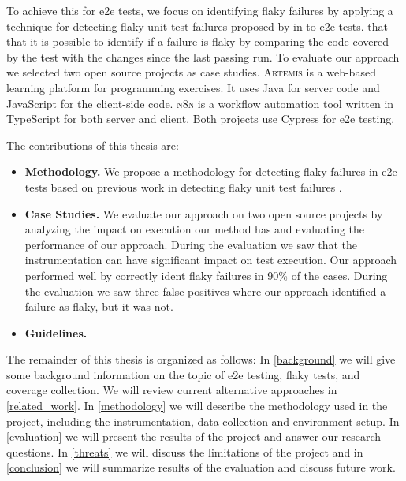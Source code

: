 To achieve this for \ac{e2e} tests, we focus on identifying flaky failures by applying a technique for detecting flaky unit test failures proposed by \citeauthor*{bell_deflaker_2018} in  \autocite{bell_deflaker_2018} to \ac{e2e} tests. 
 that that it is possible to identify if a failure is flaky by comparing the code covered by the test with the changes since the last passing run. To evaluate our approach we selected two open source projects as case studies. 
\textsc{Artemis} \autocite{krusche_artemis_2018} is a web-based learning platform for programming exercises. 
It uses Java for server code and JavaScript for the client-side code. \textsc{n8n} \autocite{noauthor_n8n_2023} is a workflow automation tool written in TypeScript for both server and client. 
Both projects use Cypress \autocite{noauthor_cypress-iocypress_2023} for \ac{e2e} testing.

The contributions of this thesis are:
\begin{itemize}
	\item \textbf{Methodology.} We propose a methodology for detecting flaky failures in \ac{e2e} tests based on previous work in detecting flaky unit test failures \autocite{bell_deflaker_2018}.
	\item \textbf{Case Studies.} We evaluate our approach on two open source projects by analyzing the impact on execution our method has and evaluating the performance of our approach. 
	During the evaluation we saw that the instrumentation can have significant impact on test execution. 
	Our approach performed well by correctly ident flaky failures in 90\%  of the cases.
	During the evaluation we saw three  false positives where our approach identified a failure as flaky, but it was not.
	\item \textbf{Guidelines.} 
\end{itemize}

The remainder of this thesis is organized as follows:
In \cref{background} we will give some background information on the topic of \ac{e2e} testing, flaky tests, and coverage collection.
We will review current alternative approaches in \cref{related_work}.
In \cref{methodology} we will describe the methodology used in the project, including the instrumentation, data collection and environment setup.
In \cref{evaluation} we will present the results of the project and answer our research questions.
In \cref{threats} we will discuss the limitations of the project and in \cref{conclusion} we will summarize results of the evaluation and discuss future work.



